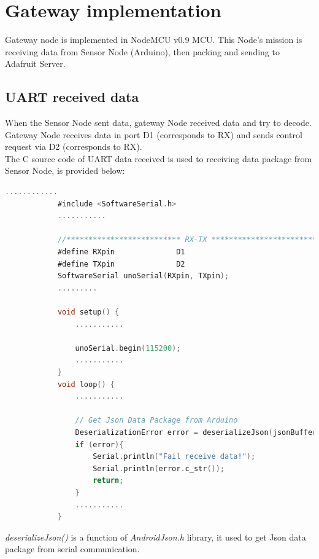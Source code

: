 \documentclass[13pt,a4paper]{article}
\begin{document}
	\section{Gateway implementation}
	Gateway node is implemented in NodeMCU v0.9 MCU. This Node's mission is receiving data from Sensor Node (Arduino), then packing and sending to Adafruit Server.
		\subsection{UART received data}
		When the Sensor Node sent data, gateway Node received data and try to decode. Gateway Node receives data in port D1 (corresponds to RX) and sends control request via D2 (corresponds to RX). \\
		The C source code of UART data received is used to receiving data package from Sensor Node, is provided below:
		 \begin{lstlisting}[language=C, caption= Data received from Sensor Node, label=test_float]
		 	............
		 	#include <SoftwareSerial.h>
		 	...........
		 	
		 	//************************** RX-TX ***********************************************
		 	#define RXpin              D1
		 	#define TXpin              D2
		 	SoftwareSerial unoSerial(RXpin, TXpin);
		 	.........
		 	
		 	void setup() {
		 		...........
		 		
		 		unoSerial.begin(115200);
		 		...........
		 	}
		 	void loop() {
		 		...........
		 		
		 		// Get Json Data Package from Arduino
		 		DeserializationError error = deserializeJson(jsonBuffer, unoSerial);
		 		if (error){
		 			Serial.println("Fail receive data!");
		 			Serial.println(error.c_str());
		 			return;
		 		}
		 		...........
		 	}
		 \end{lstlisting}
		 \textit{deserializeJson()} is a function of \textit{AndroidJson.h} library, it used to get Json data package from serial communication.
\end{document}
